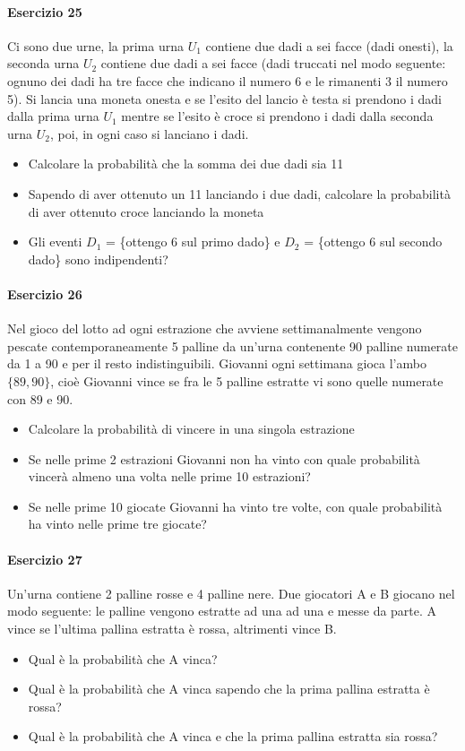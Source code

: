 \documentclass[12pt]{article}
\begin{document}
    \paragraph{Esercizio 25}
    Ci sono due urne, la prima urna $U_1$ contiene due dadi a sei facce (dadi onesti), la seconda urna $U_2$ contiene due dadi a sei facce (dadi truccati nel modo seguente: ognuno dei dadi ha tre facce che indicano il numero 6 e le rimanenti 3 il numero 5). Si lancia una moneta onesta e se l’esito del lancio è testa si prendono i dadi dalla prima urna $U_1$ mentre se l’esito è croce si prendono i dadi dalla seconda urna $U_2$, poi, in ogni caso si lanciano i dadi.
    \begin{itemize}
        \item Calcolare la probabilità che la somma dei due dadi sia 11
        \item Sapendo di aver ottenuto un 11 lanciando i due dadi, calcolare la probabilità di aver ottenuto croce lanciando la moneta
        \item Gli eventi $D_1$ = \{ottengo 6 sul primo dado\} e $D_2$ = \{ottengo 6 sul secondo dado\} sono indipendenti?
    \end{itemize}
    \paragraph{Esercizio 26}
    Nel gioco del lotto ad ogni estrazione che avviene settimanalmente vengono pescate contemporaneamente 5 palline da un’urna contenente 90 palline numerate da 1 a 90 e per il resto indistinguibili. Giovanni ogni settimana gioca l’ambo $\{89,90\}$, cioè Giovanni vince se fra le 5 palline estratte vi sono quelle numerate con 89 e 90.
    \begin{itemize}
        \item Calcolare la probabilità di vincere in una singola estrazione
        \item Se nelle prime 2 estrazioni Giovanni non ha vinto con quale probabilità vincerà almeno una volta nelle prime 10 estrazioni?
        \item Se nelle prime 10 giocate Giovanni ha vinto tre volte, con quale probabilità ha vinto nelle prime tre giocate?
    \end{itemize}
    \paragraph{Esercizio 27}
    Un’urna contiene 2 palline rosse e 4 palline nere. Due giocatori A e B giocano nel modo seguente: le palline vengono estratte ad una ad una e messe da parte. A vince se l’ultima pallina estratta è rossa, altrimenti vince B.
    \begin{itemize}
        \item Qual è la probabilità che A vinca?
        \item Qual è la probabilità che A vinca sapendo che la prima pallina estratta è rossa?
        \item Qual è la probabilità che A vinca e che la prima pallina estratta sia rossa?
    \end{itemize}
\end{document}
